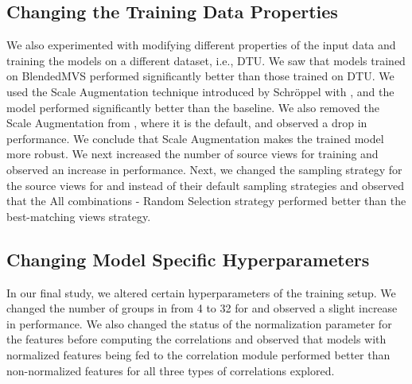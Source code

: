 \subsection*{Changing the Training Data Properties}
We also experimented with modifying different properties of the input data and training the models on a different dataset, i.e., DTU. We saw that models trained on BlendedMVS performed significantly better than those trained on DTU. We used the Scale Augmentation technique introduced by Schröppel \etal \cite{schroeppel2022benchmark} with {\mvsn}, and the model performed significantly better than the baseline. We also removed the Scale Augmentation from {\rmvd}, where it is the default, and observed a drop in performance. We conclude that Scale Augmentation makes the trained model more robust. We next increased the number of source views for training {\mvsn} and observed an increase in performance. Next, we changed the sampling strategy for the source views for {\mvsn} and {\rmvd} instead of their default sampling strategies and observed that the All combinations - Random Selection strategy performed better than the best-matching views strategy. \par

\subsection*{Changing Model Specific Hyperparameters}
In our final study, we altered certain hyperparameters of the training setup. We changed the number of groups in {\gwc} from 4 to 32 for {\mvsn} and observed a slight increase in performance. We also changed the status of the normalization parameter for the features before computing the correlations and observed that models with normalized features being fed to the correlation module performed better than non-normalized features for all three types of correlations explored. \par


